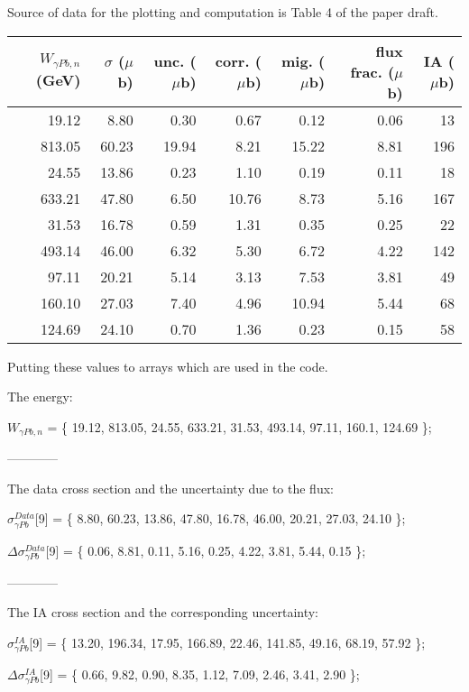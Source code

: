 \documentclass[a4paper,12pt]{article}
\begin{document}

Source of data for the plotting and computation is Table 4 of the paper draft. 

\begin{table}[h!]
\begin{tabular}{rrrrrrr}
\hline
 $W_{\gamma Pb,n}$ (GeV) & $\sigma$ ($\mu$b) & unc. ($\mu$b)  & corr. ($\mu$b) & mig. ($\mu$b) & flux frac. ($\mu$b)  & IA ($\mu$b) \\
\hline
19.12 &8.80 &0.30 &0.67 &0.12 &0.06 &13 \\
813.05 &60.23 &19.94 &8.21 &15.22 &8.81 & 196  \\
\hline
24.55 &13.86 &0.23 &1.10 &0.19 &0.11  & 18\\
633.21 &47.80 &6.50 &10.76 &8.73 &5.16  & 167\\
\hline
31.53 &16.78 &0.59 &1.31 &0.35 &0.25  & 22\\
493.14 &46.00 &6.32 &5.30 &6.72 &4.22  & 142\\
\hline
97.11 &20.21 &5.14 &3.13 &7.53 &3.81  & 49\\
160.10 &27.03 &7.40 &4.96 &10.94 &5.44  & 68\\
\hline
124.69 &24.10 &0.70 &1.36 &0.23 &0.15 & 58\\
\hline
\end{tabular}
\end{table}

Putting these values to arrays which are used in the code.

The energy:

$W_{\gamma Pb,n}$    = \{ 19.12, 813.05, 24.55, 633.21, 31.53, 493.14, 97.11, 160.1, 124.69  \};

------------

The data cross section and the uncertainty due to the flux:

$\sigma^{Data}_{\gamma Pb}$[9]  = \{ 8.80, 60.23, 13.86, 47.80, 16.78, 46.00, 20.21, 27.03, 24.10  \};

$\Delta{\sigma^{Data}_{\gamma Pb}}$[9]  = \{ 0.06, 8.81,  0.11, 5.16, 0.25, 4.22, 3.81, 5.44, 0.15  \};

------------

The IA cross section and the corresponding uncertainty:

$\sigma^{IA}_{\gamma Pb}$[9]  = \{ 13.20, 196.34, 17.95, 166.89, 22.46, 141.85, 49.16, 68.19, 57.92  \};

$\Delta{\sigma^{IA}_{\gamma Pb}}$[9]  = \{ 0.66, 9.82, 0.90, 8.35, 1.12, 7.09, 2.46, 3.41, 2.90  \};
\end{document}
